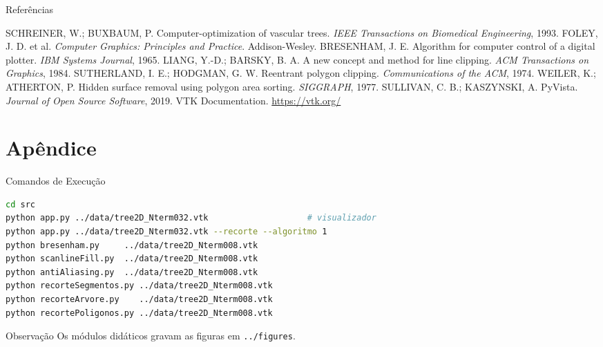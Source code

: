 \documentclass[aspectratio=169,11pt]{beamer}
\begin{document}
\begin{frame}{Referências}
\footnotesize
\begin{thebibliography}{99}
 SCHREINER, W.; BUXBAUM, P. Computer-optimization of vascular trees. \textit{IEEE Transactions on Biomedical Engineering}, 1993.
 FOLEY, J. D. et al. \textit{Computer Graphics: Principles and Practice}. Addison-Wesley.
 BRESENHAM, J. E. Algorithm for computer control of a digital plotter. \textit{IBM Systems Journal}, 1965.
 LIANG, Y.-D.; BARSKY, B. A. A new concept and method for line clipping. \textit{ACM Transactions on Graphics}, 1984.
 SUTHERLAND, I. E.; HODGMAN, G. W. Reentrant polygon clipping. \textit{Communications of the ACM}, 1974.
 WEILER, K.; ATHERTON, P. Hidden surface removal using polygon area sorting. \textit{SIGGRAPH}, 1977.
 SULLIVAN, C. B.; KASZYNSKI, A. PyVista. \textit{Journal of Open Source Software}, 2019.
 VTK Documentation. \url{https://vtk.org/}
\end{thebibliography}
\end{frame}

\appendix
\section{Apêndice}

\begin{frame}[fragile]{Comandos de Execução}
\begin{lstlisting}[language=bash]
cd src
python app.py ../data/tree2D_Nterm032.vtk                    # visualizador
python app.py ../data/tree2D_Nterm032.vtk --recorte --algoritmo 1
python bresenham.py     ../data/tree2D_Nterm008.vtk
python scanlineFill.py  ../data/tree2D_Nterm008.vtk
python antiAliasing.py  ../data/tree2D_Nterm008.vtk
python recorteSegmentos.py ../data/tree2D_Nterm008.vtk
python recorteArvore.py    ../data/tree2D_Nterm008.vtk
python recortePoligonos.py ../data/tree2D_Nterm008.vtk
\end{lstlisting}

\begin{block}{Observação}
\small
Os módulos didáticos gravam as figuras em \texttt{../figures}.
\end{block}
\end{frame}
\end{document}
